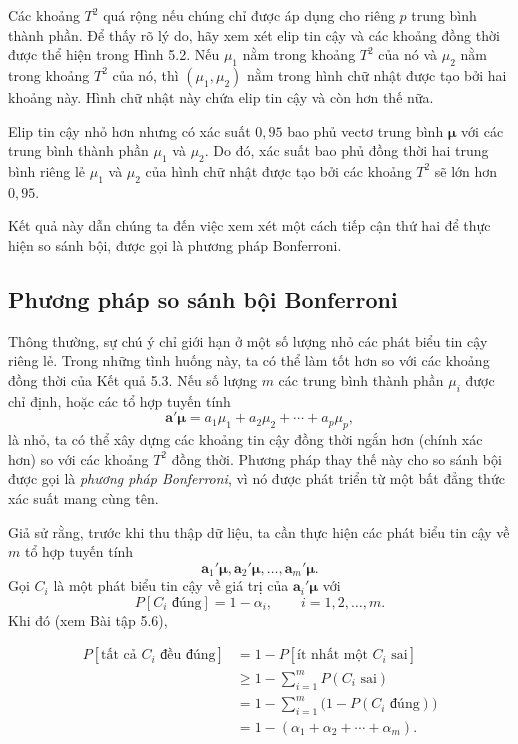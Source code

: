 Các khoảng $T^2$ quá rộng nếu chúng chỉ được áp dụng cho riêng $p$ trung bình thành phần. Để thấy rõ lý do, hãy xem xét elip tin cậy và các khoảng đồng thời được thể hiện trong Hình 5.2. Nếu $\mu_1$ nằm trong khoảng $T^2$ của nó và $\mu_2$ nằm trong khoảng $T^2$ của nó, thì $(\mu_1,\mu_2)$ nằm trong hình chữ nhật được tạo bởi hai khoảng này. Hình chữ nhật này chứa elip tin cậy và còn hơn thế nữa.
 
Elip tin cậy nhỏ hơn nhưng có xác suất $0{,}95$ bao phủ vectơ trung bình $\boldsymbol{\mu}$ với các trung bình thành phần $\mu_1$ và $\mu_2$. Do đó, xác suất bao phủ đồng thời hai trung bình riêng lẻ $\mu_1$ và $\mu_2$ của hình chữ nhật được tạo bởi các khoảng $T^2$ sẽ lớn hơn $0{,}95$.
 
Kết quả này dẫn chúng ta đến việc xem xét một cách tiếp cận thứ hai để thực hiện so sánh bội, được gọi là phương pháp Bonferroni.
 
\subsection*{Phương pháp so sánh bội Bonferroni}
 
Thông thường, sự chú ý chỉ giới hạn ở một số lượng nhỏ các phát biểu tin cậy riêng lẻ. Trong những tình huống này, ta có thể làm tốt hơn so với các khoảng đồng thời của Kết quả 5.3. Nếu số lượng $m$ các trung bình thành phần $\mu_i$ được chỉ định, hoặc các tổ hợp tuyến tính
\[
\mathbf{a}'\boldsymbol{\mu}
=
a_1\mu_1+a_2\mu_2+\cdots+a_p\mu_p,
\]
là nhỏ, ta có thể xây dựng các khoảng tin cậy đồng thời ngắn hơn (chính xác hơn) so với các khoảng $T^2$ đồng thời. Phương pháp thay thế này cho so sánh bội được gọi là \textit{phương pháp Bonferroni}, vì nó được phát triển từ một bất đẳng thức xác suất mang cùng tên.
 
Giả sử rằng, trước khi thu thập dữ liệu, ta cần thực hiện các phát biểu tin cậy về $m$ tổ hợp tuyến tính
\[
\mathbf{a}_1'\boldsymbol{\mu},
\mathbf{a}_2'\boldsymbol{\mu},
\ldots,
\mathbf{a}_m'\boldsymbol{\mu}.
\]
Gọi $C_i$ là một phát biểu tin cậy về giá trị của $\mathbf{a}_i'\boldsymbol{\mu}$ với
\[
P[C_i\text{ đúng}]=1-\alpha_i,
\qquad i=1,2,\ldots,m.
\]
Khi đó (xem Bài tập 5.6),
 
\begin{equation*}
\tag{5-28}
\begin{aligned}
P[\text{tất cả }C_i\text{ đều đúng}]
&=1-P[\text{ít nhất một }C_i\text{ sai}]\\
&\geq 1-\sum_{i=1}^{m}P(C_i\text{ sai})\\
&=1-\sum_{i=1}^{m}\bigl(1-P(C_i\text{ đúng})\bigr)\\
&=1-(\alpha_1+\alpha_2+\cdots+\alpha_m).
\end{aligned}
\end{equation*}
 
